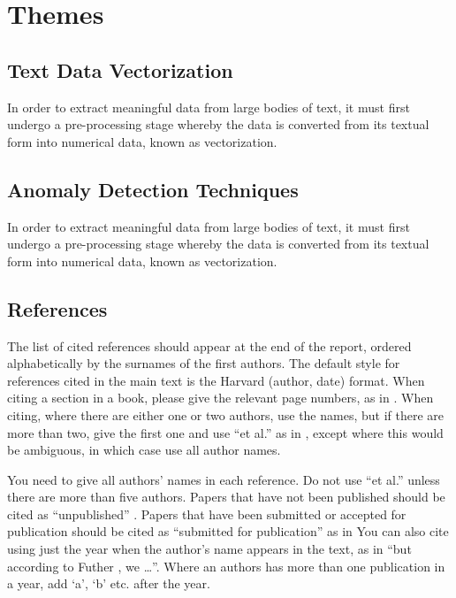 \documentclass[12pt,a4paper]{article}
\begin{document}
\newpage

\section{Themes}

\subsection{Text Data Vectorization}
In order to extract meaningful data from large bodies of text, it must first undergo a pre-processing stage whereby the data is converted from its textual form into numerical data, known as vectorization. 

\subsection{Anomaly Detection Techniques}
In order to extract meaningful data from large bodies of text, it must first undergo a pre-processing stage whereby the data is converted from its textual form into numerical data, known as vectorization. 

\newpage

\subsection{References}
\cite{pennington2014glove}
The list of cited references should appear at the end of the report,
ordered alphabetically by the surnames of the first authors.
The default style for references cited in the main text is the  Harvard (author, date) format.
When citing a section in a book, please give the relevant page numbers, as in \cite[p293]{budgen}.
When citing, where there are either one or two authors, use the names,
but if there are more than two, give the first one and use ``et al.''
as in  , except where this would be ambiguous, in which case use all author names.

You need to give all authors' names in each reference. Do not use ``et al.'' unless there are more than five authors.
Papers that have not been published should be cited as ``unpublished'' \cite{euther}.
Papers that have been submitted or accepted for publication should be cited as ``submitted for publication'' as in \cite{futher}
You can also cite using just the year when the author's name appears in the text, as in ``but according to Futher
\citeyear{futher},
we \dots''.  Where an authors has more than one publication in a year, add `a', `b' etc. after the year.





\end{document}
